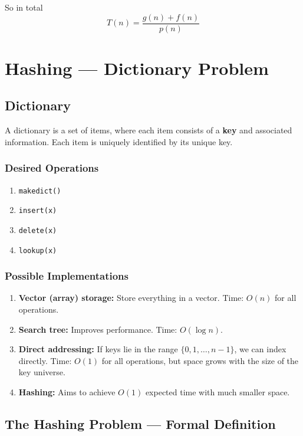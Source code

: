 \documentclass{article}
\begin{document}
So in total
\[T(n) = \frac{g(n) + f(n)}{p(n)} \]

\section{Hashing — Dictionary Problem}

\subsection{Dictionary}

A dictionary is a set of items, where each item consists of a \textbf{key} and associated information.  
Each item is uniquely identified by its unique key.

\subsubsection{Desired Operations}
\begin{enumerate}
    \item \texttt{makedict()}
    \item \texttt{insert(x)}
    \item \texttt{delete(x)}
    \item \texttt{lookup(x)}
\end{enumerate}

\subsubsection{Possible Implementations}
\begin{enumerate}
    \item \textbf{Vector (array) storage:}  
    Store everything in a vector.  
    Time: $O(n)$ for all operations.

    \item \textbf{Search tree:}  
    Improves performance.  
    Time: $O(\log n)$.

    \item \textbf{Direct addressing:}  
    If keys lie in the range $\{0,1,\dots,n-1\}$, we can index directly.  
    Time: $O(1)$ for all operations, but space grows with the size of the key universe.

    \item \textbf{Hashing:}  
    Aims to achieve $O(1)$ expected time with much smaller space.
\end{enumerate}

\subsection{The Hashing Problem — Formal Definition}
\end{document}

